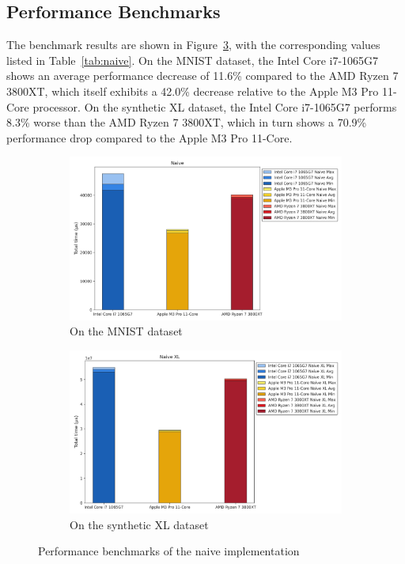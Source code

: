 \documentclass[modern,longauthor]{aastex7}
\begin{document}
\subsection{Performance Benchmarks}
The benchmark results are shown in Figure~\ref{fig:naive}, with the corresponding values listed in Table~\ref{tab:naive}. On the MNIST dataset, the Intel Core i7-1065G7 shows an average performance decrease of 11.6\% compared to the AMD Ryzen 7 3800XT, which itself exhibits a 42.0\% decrease relative to the Apple M3 Pro 11-Core processor. On the synthetic XL dataset, the Intel Core i7-1065G7 performs 8.3\% worse than the AMD Ryzen 7 3800XT, which in turn shows a 70.9\% performance drop compared to the Apple M3 Pro 11-Core.
\begin{figure}[htb!]
\centering
\begin{subfigure}{.5\textwidth}
  \centering
  \includegraphics[width=\linewidth]{Graphs/Naive.png}
  \caption{On the MNIST dataset}
 \label{fig:naive_mnist}
\end{subfigure}%
\begin{subfigure}{.5\textwidth}
  \centering
  \includegraphics[width=\linewidth]{Graphs/Naive XL.png}
  \caption{On the synthetic XL dataset}
 \label{fig:naive_xl}
\end{subfigure}
\caption{Performance benchmarks of the naive implementation}
\label{fig:naive}
\end{figure}
\end{document}
